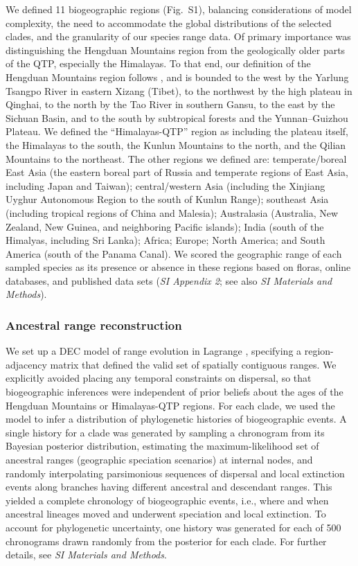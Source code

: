 We defined 11 biogeographic regions (Fig.~S1), balancing considerations of model complexity, the need to accommodate the global distributions of the selected clades, and the granularity of our species range data. Of primary importance was distinguishing the Hengduan Mountains region from the geologically older parts of the QTP, especially the Himalayas. To that end, our definition of the Hengduan Mountains region follows \citet{Boufford2014}, and is bounded to the west by the Yarlung Tsangpo River in eastern Xizang (Tibet), to the northwest by the high plateau in Qinghai, to the north by the Tao River in southern Gansu, to the east by the Sichuan Basin, and to the south by subtropical forests and the Yunnan–Guizhou Plateau. We defined the ``Himalayas-QTP'' region as including the plateau itself, the Himalayas to the south, the Kunlun Mountains to the north, and the Qilian Mountains to the northeast. The other regions we defined are: temperate/boreal East Asia (the eastern boreal part of Russia and temperate regions of East Asia, including Japan and Taiwan); central/western Asia (including the Xinjiang Uyghur Autonomous Region to the south of Kunlun Range); southeast Asia (including tropical regions of China and Malesia); Australasia (Australia, New Zealand, New Guinea, and neighboring Pacific islands); India (south of the Himalyas, including Sri Lanka); Africa; Europe; North America; and South America (south of the Panama Canal). We scored the geographic range of each sampled species as its presence or absence in these regions based on floras, online databases, and published data sets (\textit{SI Appendix 2}; see also \textit{SI Materials and Methods}).

\subsubsection{Ancestral range reconstruction}

We set up a DEC model of range evolution in Lagrange \citep{Ree2005,Ree2008}, specifying a region-adjacency matrix that defined the valid set of spatially contiguous ranges. We explicitly avoided placing any temporal constraints on dispersal, so that biogeographic inferences were independent of prior beliefs about the ages of the Hengduan Mountains or Himalayas-QTP regions. For each clade, we used the model to infer a distribution of phylogenetic histories of biogeographic events. A single history for a clade was generated by sampling a chronogram from its Bayesian posterior distribution, estimating the maximum-likelihood set of ancestral ranges (geographic speciation scenarios) at internal nodes, and randomly interpolating parsimonious sequences of dispersal and local extinction events along branches having different ancestral and descendant ranges. This yielded a complete chronology of biogeographic events, i.e., where and when ancestral lineages moved and underwent speciation and local extinction. To account for phylogenetic uncertainty, one history was generated for each of 500 chronograms drawn randomly from the posterior for each clade. For further details, see \textit{SI Materials and Methods}.

